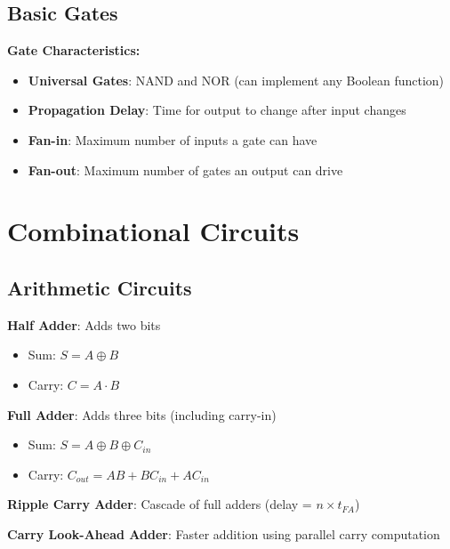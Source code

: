 \documentclass[12pt,a4paper]{report}
\begin{document}
\subsection{Basic Gates}
\begin{concept}
\textbf{Gate Characteristics:}
\begin{itemize}
    \item \textbf{Universal Gates}: NAND and NOR (can implement any Boolean function)
    \item \textbf{Propagation Delay}: Time for output to change after input changes
    \item \textbf{Fan-in}: Maximum number of inputs a gate can have
    \item \textbf{Fan-out}: Maximum number of gates an output can drive
\end{itemize}
\end{concept}

\section{Combinational Circuits}

\subsection{Arithmetic Circuits}
\begin{concept}
\textbf{Half Adder}: Adds two bits
\begin{itemize}
    \item Sum: $S = A \oplus B$
    \item Carry: $C = A \cdot B$
\end{itemize}

\textbf{Full Adder}: Adds three bits (including carry-in)
\begin{itemize}
    \item Sum: $S = A \oplus B \oplus C_{in}$
    \item Carry: $C_{out} = AB + BC_{in} + AC_{in}$
\end{itemize}

\textbf{Ripple Carry Adder}: Cascade of full adders (delay = $n \times t_{FA}$)

\textbf{Carry Look-Ahead Adder}: Faster addition using parallel carry computation
\end{concept}
\end{document}
